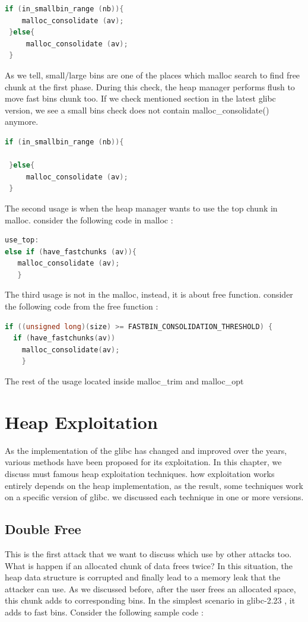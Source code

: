\documentclass{masterthesis}
\newcommand*\libc{glibc}
\newcommand*\fb{fast bins}
\newcommand*\lb{large bins}
\newcommand*\sbs{small bins}
\begin{document}
\begin{lstlisting}[language=c,frame=tlrb]
 if (in_smallbin_range (nb)){
 	malloc_consolidate (av);
 }else{
	 malloc_consolidate (av);
 }
\end{lstlisting}

As we tell, small/\lb{} are one of the places which malloc search to find free chunk at the first phase. During this check, the heap manager performs flush to move \fb{} chunk too. If we check mentioned section in the latest \libc{} version, we see a \sbs{} check does not contain malloc\_consolidate() anymore.

\begin{lstlisting}[language=c,frame=tlrb]
 if (in_smallbin_range (nb)){
 	 
 }else{
	 malloc_consolidate (av);
 }
\end{lstlisting}

The second usage is when the heap manager wants to use the top chunk in malloc. consider the following code in malloc :

\begin{lstlisting}[language=c,frame=tlrb]
use_top:
else if (have_fastchunks (av)){
   malloc_consolidate (av);
   }
\end{lstlisting}

The third usage is not in the malloc, instead, it is about free function. consider the following code from the free function :

\begin{lstlisting}[language=c,frame=tlrb]
if ((unsigned long)(size) >= FASTBIN_CONSOLIDATION_THRESHOLD) {
  if (have_fastchunks(av))
	malloc_consolidate(av);
	}
\end{lstlisting}

The rest of the usage located inside malloc\_trim and malloc\_opt

\chapter{Heap Exploitation }

As the implementation of the \libc{} has changed and improved over the years, various methods have been proposed for its exploitation. In this chapter, we discuss must famous heap exploitation techniques. how exploitation works entirely depends on the heap implementation, as the result, some techniques work on a specific version of \libc{}. we discussed each technique in one or more versions.

\section{Double Free}
This is the first attack that we want to discuss which use by other attacks too. What is happen if an allocated chunk of data frees twice? In this situation, the heap data structure is corrupted and finally lead to a memory leak that the attacker can use. As we discussed before, after the user frees an allocated space, this chunk adds to corresponding bins. In the simplest scenario in \libc{-2.23} , it adds to \fb{}. Consider the following sample code :
\end{document}
